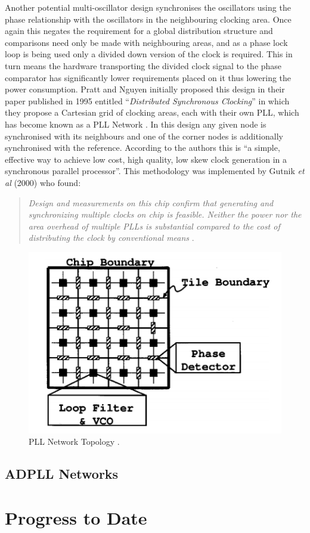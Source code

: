 \documentclass[11pt,english,british]{report}
\begin{document}
Another potential multi-oscillator design synchronises the oscillators using the phase relationship with the oscillators in the neighbouring clocking area. Once again this negates the requirement for a global distribution structure and comparisons need only be made with neighbouring areas, and as a phase lock loop is being used only a divided down version of the clock is required. This in turn means the hardware transporting the divided clock signal to the phase comparator has significantly lower requirements placed on it thus lowering the power consumption. Pratt and Nguyen initially proposed this design in their paper published in 1995 entitled ``\textit{Distributed Synchronous Clocking}'' in which they propose a Cartesian grid of clocking areas, each with their own PLL, which has become known as a PLL Network \cite{pratt1995distributed}. In this design any given node is synchronised with its neighbours and one of the corner nodes is additionally synchronised with the reference. According to the authors this is ``a simple, effective way to achieve low cost, high quality, low skew clock generation in a synchronous parallel processor''. This methodology was implemented by Gutnik \textit{et al} (2000) who found:
\begin{quote}
	\singlespacing
	\textit{Design and measurements on this chip confirm that generating and synchronizing multiple clocks on chip is feasible. Neither the power nor the area overhead of multiple PLLs is substantial compared to the cost of distributing the clock by conventional means} \cite{gutnik2000active}.
	\doublespacing
\end{quote}
\begin{figure}[h]
	\centering
	\includegraphics[scale=0.5]{../gutnik2000active}
	\caption{PLL Network Topology \cite{gutnik2000active}.}
	\label{fig:gutnik2000active}
\end{figure}

\section{ADPLL Networks}







\chapter{Progress to Date}



\newpage
 

\end{document}
